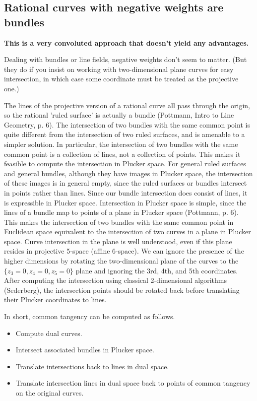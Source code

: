 \documentclass[11pt]{article}
\begin{document}
\subsection{Rational curves with negative weights are bundles}

{\bf This is a very convoluted approach that doesn't yield any advantages.}

Dealing with bundles or line fields, negative weights don't seem to matter.
(But they do if you insist on working with two-dimensional plane curves
for easy intersection, in which case some coordinate must be treated
as the projective one.)
	
The lines of the projective version of a rational curve 
all pass through the origin,
so the rational 'ruled surface' is actually a bundle (Pottmann, Intro to Line 
Geometry, p. 6).
The intersection of two bundles with the same common point
is quite different from the intersection of two ruled surfaces,
and is amenable to a simpler solution.
In particular, the intersection of two bundles with the same common point
is a collection of lines, not a collection of points.
This makes it feasible to compute the intersection in Plucker space.
For general ruled surfaces and general bundles,
although they have images in Plucker space,
the intersection of these images is in general empty, since the 
ruled surfaces or bundles intersect in points rather than lines.
Since our bundle intersection does consist of lines, it is 
expressible in Plucker space.
Intersection in Plucker space is simple, 
since the lines of a bundle map to points of a plane in Plucker space
(Pottmann, p. 6).
This makes the intersection of two bundles with the same common point in Euclidean space 
equivalent to the intersection of two curves in a plane in Plucker space.
Curve intersection in the plane is well understood, even if this plane
resides in projective 5-space (affine 6-space).
We can ignore the presence of the higher dimensions by rotating the
two-dimensional plane of the curves to the $\{z_3=0,z_4=0,z_5=0\}$
plane and ignoring the 3rd, 4th, and 5th coordinates.
After computing the intersection using classical 2-dimensional algorithms
(Sederberg), the intersection points should be rotated back before
translating their Plucker coordinates to lines.

In short, common tangency can be computed as follows.
\begin{itemize}
\item	Compute dual curves.
\item	Intersect associated bundles in Plucker space.
\item 	Translate intersections back to lines in dual space.
\item 	Translate intersection lines in dual space back to points of common
	tangency on the original curves.
\end{itemize}
\end{document}
